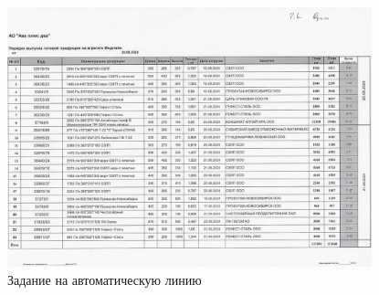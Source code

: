 \begin{figure}
\begin{center}
  \includegraphics[height=0.94\textheight, width=0.94\textwidth, keepaspectratio]{Pics 1/2.6 задание на линию в Драм_0001.jpg}
\end{center}
  \caption{Задание на автоматическую линию}
  \label{pic:2.6 задание на линию в Драм_0001}
\end{figure}

